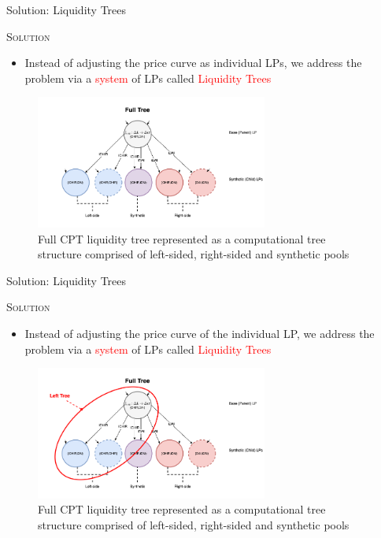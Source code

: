 \documentclass[10pt,xcolor=svgnames]{beamer} %
\newcommand{\red}[1]{\textcolor{red}{#1}}
\begin{document}
\begin{frame}{Solution: Liquidity Trees} 

\begin{exampleblock}{\textsc{Solution}}
\begin{itemize}
  \item Instead of adjusting the price curve as individual LPs, we address the problem via a \red{system} of LPs called \red{Liquidity Trees}
\end{itemize}
\end{exampleblock}

\begin{figure}[h!]
\includegraphics[width=3in]{img/full_tree.png}
\caption{Full CPT liquidity tree represented as a computational tree structure comprised of left-sided, right-sided and synthetic pools } 
\label{fig:full_tree}
\end{figure}

\end{frame}



\begin{frame}{Solution: Liquidity Trees} 

\begin{exampleblock}{\textsc{Solution}}
\begin{itemize}
  \item Instead of adjusting the price curve of the individual LP, we address the problem via a \red{system} of LPs called \red{Liquidity Trees}
\end{itemize}
\end{exampleblock}

\begin{figure}[h!]
\includegraphics[width=3in]{img/left_tree.png}
\caption{Full CPT liquidity tree represented as a computational tree structure comprised of left-sided, right-sided and synthetic pools } 
\label{fig:full_tree}
\end{figure}
\end{frame}
\end{document}
